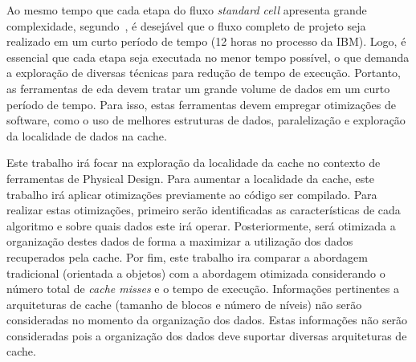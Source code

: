 Ao mesmo tempo que cada etapa do fluxo \textit{standard cell} apresenta grande complexidade, segundo~, é desejável que o fluxo completo de projeto seja realizado em um curto período de tempo (12 horas no processo da IBM). Logo, é essencial que cada etapa seja executada no menor tempo possível, o que demanda a exploração de diversas técnicas para redução de tempo de execução.
Portanto, as ferramentas de \ac{eda} devem tratar um grande volume de dados em um curto período de tempo.
Para isso, estas ferramentas devem empregar otimizações de software, como o uso de melhores estruturas de dados, paralelização e exploração da localidade de dados na cache.




Este trabalho irá focar na exploração da localidade da cache no contexto de ferramentas de Physical Design.
Para aumentar a localidade da cache, este trabalho irá aplicar otimizações previamente ao código ser compilado.
Para realizar estas otimizações, primeiro serão identificadas as características de cada algoritmo e sobre quais dados este irá operar.
Posteriormente, será otimizada a organização destes dados de forma a maximizar a utilização dos dados recuperados pela cache.
Por fim, este trabalho ira comparar a abordagem tradicional (orientada a objetos) com a abordagem otimizada considerando o número total de \textit{cache misses} e o tempo de execução. Informações pertinentes a arquiteturas de cache (tamanho de blocos e número de níveis) não serão consideradas no momento da organização dos dados.
Estas informações não serão consideradas pois a organização dos dados deve suportar diversas arquiteturas de cache.


